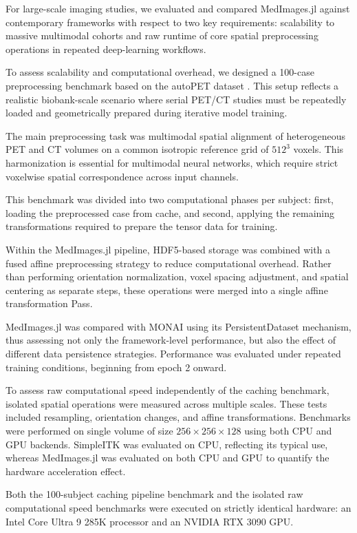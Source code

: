 \documentclass[a4paper,10pt]{elsarticle}
\begin{document}
For large-scale imaging studies, we evaluated and compared MedImages.jl against contemporary frameworks with respect to two key requirements: scalability to massive multimodal cohorts and raw runtime of core spatial preprocessing operations in repeated deep-learning workflows.

To assess scalability and computational overhead, we designed a 100-case preprocessing benchmark based on the autoPET dataset \cite{Dexl_2025}. This setup reflects a realistic biobank-scale scenario where serial PET/CT studies must be repeatedly loaded and geometrically prepared during iterative model training.

The main preprocessing task was multimodal spatial alignment of heterogeneous PET and CT volumes on a common isotropic reference grid of $512^3$ voxels. This harmonization is essential for multimodal neural networks, which require strict voxelwise spatial correspondence across input channels.

This benchmark was divided into two computational phases per subject: first, loading the preprocessed case from cache, and second, applying the remaining transformations required to prepare the tensor data for training.

Within the MedImages.jl pipeline, HDF5-based storage was combined with a fused affine preprocessing strategy to reduce computational overhead. Rather than performing orientation normalization, voxel spacing adjustment, and spatial centering as separate steps, these operations were merged into a single affine transformation Pass.

MedImages.jl was compared with MONAI  \cite{KraljevicSearle2021} using its PersistentDataset mechanism, thus assessing not only the framework-level performance, but also the effect of different data persistence strategies. Performance was evaluated under repeated training conditions, beginning from epoch 2 onward.

To assess raw computational speed independently of the caching benchmark, isolated spatial operations were measured across multiple scales. These tests included resampling, orientation changes, and affine transformations. Benchmarks were performed on single volume of size $256 \times 256 \times 128$ using both CPU and GPU backends. SimpleITK  \cite{LowekampChen2013} was evaluated on CPU, reflecting its typical use, whereas MedImages.jl was evaluated on both CPU and GPU to quantify the hardware acceleration effect.

Both the 100-subject caching pipeline benchmark and the isolated raw computational speed benchmarks were executed on strictly identical hardware: an Intel Core Ultra 9 285K processor and an NVIDIA RTX 3090 GPU.
\end{document}
